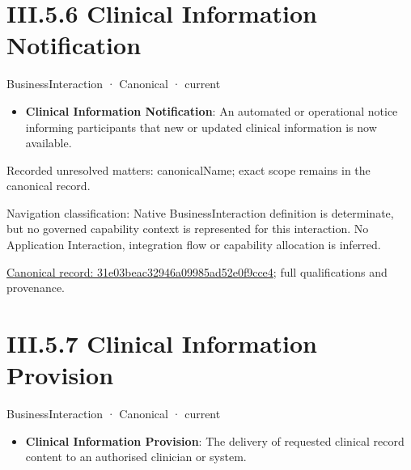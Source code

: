 \section*{III.5.6 Clinical Information Notification}
\label{navigation:III.5.6}

\label{element:31e03beac32946a09985ad52e0f9cce4}
{\small BusinessInteraction · Canonical · current}\par

\begin{itemize}


\item \textbf{Clinical Information Notification}: An automated or operational notice informing participants that new or updated clinical information is now available.

\end{itemize}

{\small Recorded unresolved matters: canonicalName; exact scope remains in the canonical record.}\par
{\small Navigation classification: Native BusinessInteraction definition is determinate, but no governed capability context is represented for this interaction. No Application Interaction, integration flow or capability allocation is inferred.}\par
{\footnotesize \href{../../../../continuum/business/business-interaction/31e03beac32946a09985ad52e0f9cce4.md}{Canonical record: 31e03beac32946a09985ad52e0f9cce4}; full qualifications and provenance.}\par
\section*{III.5.7 Clinical Information Provision}
\label{navigation:III.5.7}

\label{element:4d34b3705cb0405a910ddcacfdd6b6d3}
{\small BusinessInteraction · Canonical · current}\par

\begin{itemize}


\item \textbf{Clinical Information Provision}: The delivery of requested clinical record content to an authorised clinician or system.

\end{itemize}

